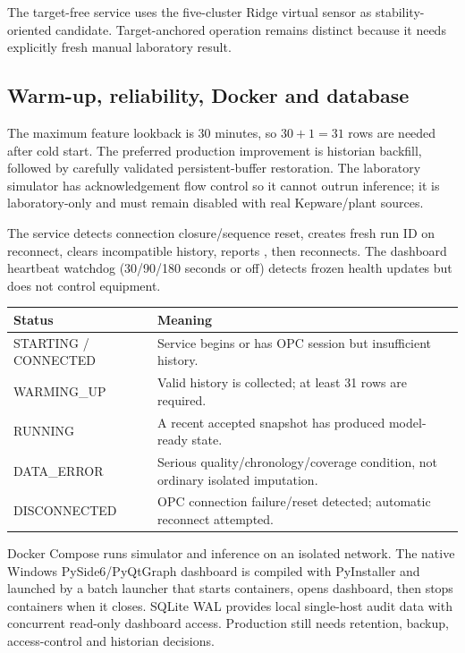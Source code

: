 \documentclass[10pt,a4paper]{article}
\begin{document}
The target-free service uses the five-cluster Ridge virtual sensor as stability-oriented candidate. Target-anchored operation remains distinct because it needs explicitly fresh manual laboratory result.

\subsection{Warm-up, reliability, Docker and database}
The maximum feature lookback is 30 minutes, so $30+1=31$ rows are needed after cold start. The preferred production improvement is historian backfill, followed by carefully validated persistent-buffer restoration. The laboratory simulator has acknowledgement flow control so it cannot outrun inference; it is laboratory-only and must remain disabled with real Kepware/plant sources.

The service detects connection closure/sequence reset, creates fresh run ID on reconnect, clears incompatible history, reports , then reconnects. The dashboard heartbeat watchdog (30/90/180 seconds or off) detects frozen health updates but does not control equipment.
\begin{table}[H]\centering\begin{tabularx}{\textwidth}{L{0.24\textwidth}Y}\toprule \textbf{Status} & \textbf{Meaning}\\\midrule
STARTING / CONNECTED & Service begins or has OPC session but insufficient history.\\
WARMING\_UP & Valid history is collected; at least 31 rows are required.\\
RUNNING & A recent accepted snapshot has produced model-ready state.\\
DATA\_ERROR & Serious quality/chronology/coverage condition, not ordinary isolated imputation.\\
DISCONNECTED & OPC connection failure/reset detected; automatic reconnect attempted.\\\bottomrule\end{tabularx}\end{table}

Docker Compose runs simulator and inference on an isolated network. The native Windows PySide6/PyQtGraph dashboard is compiled with PyInstaller and launched by a batch launcher that starts containers, opens dashboard, then stops containers when it closes. SQLite WAL provides local single-host audit data with concurrent read-only dashboard access. Production still needs retention, backup, access-control and historian decisions.
\end{document}
